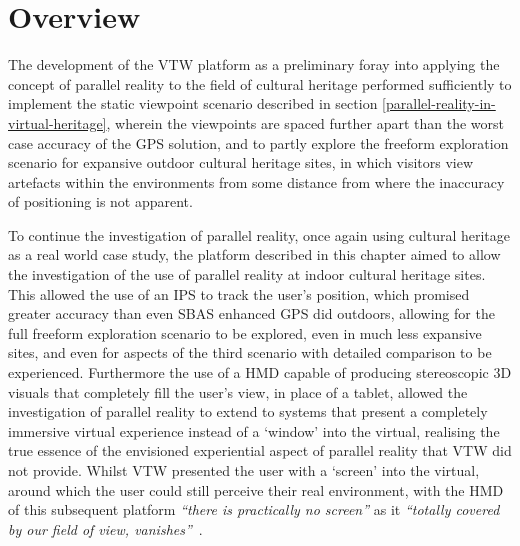 




\section{Overview}
The development of the VTW platform as a preliminary foray into applying the concept of parallel reality to the field of cultural heritage performed sufficiently to implement the static viewpoint scenario described in section \ref{parallel-reality-in-virtual-heritage}, wherein the viewpoints are spaced further apart than the worst case accuracy of the GPS solution, and to partly explore the freeform exploration scenario for expansive outdoor cultural heritage sites, in which visitors view artefacts within the environments from some distance from where the inaccuracy of positioning is not apparent.

To continue the investigation of parallel reality, once again using cultural heritage as a real world case study, the platform described in this chapter aimed to allow the investigation of the use of parallel reality at indoor cultural heritage sites. This allowed the use of an IPS to track the user's position, which promised greater accuracy than even SBAS enhanced GPS did outdoors, allowing for the full freeform exploration scenario to be explored, even in much less expansive sites, and even for aspects of the third scenario with detailed comparison to be experienced. Furthermore the use of a HMD capable of producing stereoscopic 3D visuals that completely fill the user's view, in place of a tablet, allowed the investigation of parallel reality to extend to systems that present a completely immersive virtual experience instead of a `window' into the virtual, realising the true essence of the envisioned experiential aspect of parallel reality that VTW did not provide. Whilst VTW presented the user with a `screen' into the virtual, around which the user could still perceive their real environment, with the HMD of this subsequent platform \textit{``there is practically no screen''} as it \textit{``totally covered by our field of view, vanishes''}~\cite{Tzortzaki2002}.

